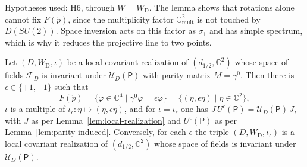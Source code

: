 \noindent Hypotheses used: H6, through $W=W_{\mathrm{D}}$. The lemma shows that rotations alone cannot fix $F(\mathring{p})$, since the multiplicity factor $\mathbb{C}^2_{\mathrm{mult}}$ is not touched by $D(SU(2))$. Space inversion acts on this factor as $\sigma_1$ and has simple spectrum, which is why it reduces the projective line to two points.

\begin{proposition}\label{prop:rest-selection}
	Let $(D,W_{\mathrm{D}},\iota)$ be a local covariant realization of $(d_{1/2},\mathbb{C}^2)$ whose space of fields $\mathcal{F}_D$ is invariant under $\mathcal{U}_D(\mathsf{P})$ with parity matrix $M=\gamma^0$. Then there is $\epsilon\in\{+1,-1\}$ such that
	\begin{equation}\label{eq:rest-subspace}
		F(\mathring{p})=\{\varphi\in\mathbb{C}^4\mid\gamma^0\varphi=\epsilon\varphi\}=\{(\eta,\epsilon\eta)\mid\eta\in\mathbb{C}^2\},
	\end{equation}
	$\iota$ is a multiple of $\iota_\epsilon:\eta\mapsto(\eta,\epsilon\eta)$, and for $\iota=\iota_\epsilon$ one has $J\,U^\epsilon(\mathsf{P})=\mathcal{U}_D(\mathsf{P})\,J$, with $J$ as per Lemma~\ref{lem:local-realization} and $U^\epsilon(\mathsf{P})$ as per Lemma~\ref{lem:parity-induced}. Conversely, for each $\epsilon$ the triple $(D,W_{\mathrm{D}},\iota_\epsilon)$ is a local covariant realization of $(d_{1/2},\mathbb{C}^2)$ whose space of fields is invariant under $\mathcal{U}_D(\mathsf{P})$.
\end{proposition}

